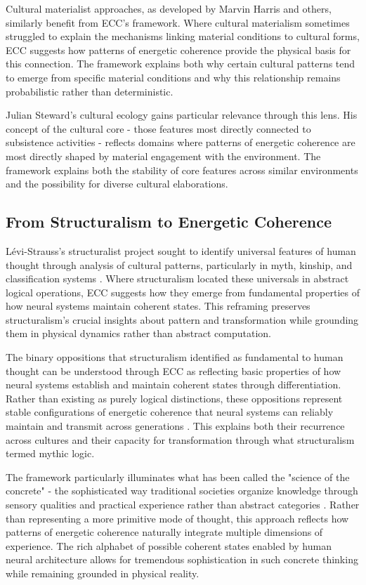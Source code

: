 \begin{refsection}
Cultural materialist approaches, as developed by Marvin Harris and others, similarly benefit from ECC's framework. Where cultural materialism sometimes struggled to explain the mechanisms linking material conditions to cultural forms, ECC suggests how patterns of energetic coherence provide the physical basis for this connection. The framework explains both why certain cultural patterns tend to emerge from specific material conditions and why this relationship remains probabilistic rather than deterministic.

Julian Steward's cultural ecology gains particular relevance through this lens. His concept of the cultural core - those features most directly connected to subsistence activities - reflects domains where patterns of energetic coherence are most directly shaped by material engagement with the environment. The framework explains both the stability of core features across similar environments and the possibility for diverse cultural elaborations.

\subsection{From Structuralism to Energetic Coherence}

Lévi-Strauss's structuralist project sought to identify universal features of human thought through analysis of cultural patterns, particularly in myth, kinship, and classification systems \cite{levi1966savage}. Where structuralism located these universals in abstract logical operations, ECC suggests how they emerge from fundamental properties of how neural systems maintain coherent states. This reframing preserves structuralism's crucial insights about pattern and transformation while grounding them in physical dynamics rather than abstract computation.

The binary oppositions that structuralism identified as fundamental to human thought can be understood through ECC as reflecting basic properties of how neural systems establish and maintain coherent states through differentiation. Rather than existing as purely logical distinctions, these oppositions represent stable configurations of energetic coherence that neural systems can reliably maintain and transmit across generations \cite{piaget1971structuralism}. This explains both their recurrence across cultures and their capacity for transformation through what structuralism termed mythic logic.

The framework particularly illuminates what has been called the "science of the concrete" - the sophisticated way traditional societies organize knowledge through sensory qualities and practical experience rather than abstract categories \cite{levi1966savage}. Rather than representing a more primitive mode of thought, this approach reflects how patterns of energetic coherence naturally integrate multiple dimensions of experience. The rich alphabet of possible coherent states enabled by human neural architecture allows for tremendous sophistication in such concrete thinking while remaining grounded in physical reality.


\end{refsection}
